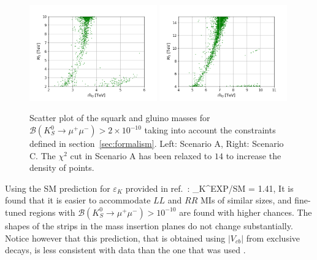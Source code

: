\begin{figure}
\centering
\includegraphics[width=0.49\textwidth]{figs/msq_vs_mg_SCA.png}
\includegraphics[width=0.49\textwidth]{figs/msq_vs_mg.png}
\caption{\label{fig:msq_vs_mg} Scatter plot of the squark and gluino masses for $\mathcal{B}(K_S^0\rightarrow\mu^+\mu^-) > 2\times 10^{-10}$ taking into account the constraints defined in section~\ref{sec:formalism}. Left: Scenario A, Right: Scenario C. The $\chi^2$ cut in Scenario A has been relaxed to $14$ to increase the density of points.}
\end{figure}
 
Using the SM prediction for $\varepsilon_K$ provided in ref.~\cite{Jang:2017ieg}:
\beq
\varepsilon_K^{\rm EXP/SM} =  1.41,
\eeq
It is found that it is easier to accommodate $LL$ and $RR$ MIs of similar sizes, and fine-tuned regions with  $\mathcal{B}(K_S^0\rightarrow\mu^+\mu^-) > 10^{-10}$ are found with higher chances. The shapes of the strips in the mass insertion planes do not change substantially. Notice however that this prediction, that is obtained using $|V_{cb}|$ from exclusive decays, is less consistent with data than the one that was used .

